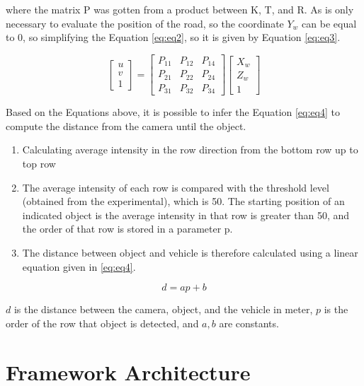 where the matrix P was gotten from a product between K, T, and R. As is only necessary to evaluate the position of the road, so the coordinate $Y_w$ can be equal to 0, so simplifying the Equation \ref{eq:eq2}, so it is given by Equation \ref{eq:eq3}.

\begin{equation}
    \label{eq:eq3}
    \begin{bmatrix}
u\\ 
v\\ 
1
\end{bmatrix}
=\begin{bmatrix}
P_{11} & P_{12}  & P_{14}\\ 
P_{21} & P_{22}  & P_{24}\\ 
P_{31} & P_{32}  & P_{34}
\end{bmatrix}
\begin{bmatrix}
X_w\\ 
Z_w\\
1
\end{bmatrix}
\end{equation}

Based on the Equations above, it is possible to infer the Equation \ref{eq:eq4} to compute the distance from the camera until the object. 

\begin{enumerate}
    \item Calculating average intensity in the row direction from the bottom row up to top row
    \item The average intensity of each row is compared with the threshold level (obtained from the experimental), which is 50. The starting position of an indicated object is the average intensity in that row is greater than 50, and the order of that row is stored in a parameter p.
    \item The distance between object and vehicle is therefore calculated using a linear equation given in \ref{eq:eq4}.
\end{enumerate}

\begin{equation}
    \label{eq:eq4}
    d = ap+b
\end{equation}

$d$ is the distance between the camera, object, and the vehicle in meter, $p$ is the order of the row that object is detected, and $a, b$ are constants.

 
\section{Framework Architecture} \label{framework}

